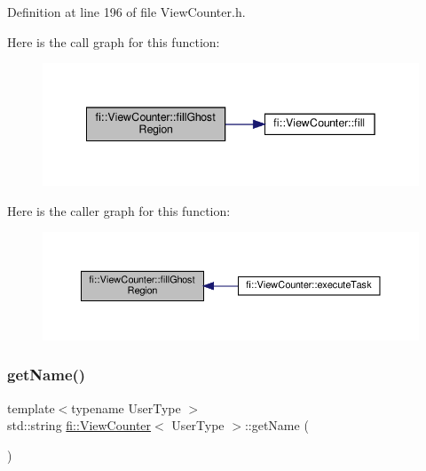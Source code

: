 Definition at line 196 of file View\+Counter.\+h.

Here is the call graph for this function\+:
\nopagebreak
\begin{figure}[H]
\begin{center}
\leavevmode
\includegraphics[width=342pt]{df/dae/classfi_1_1ViewCounter_a9b208c1ff386265adc30d4e338dbc2c8_cgraph}
\end{center}
\end{figure}
Here is the caller graph for this function\+:
\nopagebreak
\begin{figure}[H]
\begin{center}
\leavevmode
\includegraphics[width=350pt]{df/dae/classfi_1_1ViewCounter_a9b208c1ff386265adc30d4e338dbc2c8_icgraph}
\end{center}
\end{figure}
\mbox{\label{classfi_1_1ViewCounter_a555dfa42020fa6cc1a710221838b2e1e}} 
\subsubsection{\texorpdfstring{get\+Name()}{getName()}}
{\footnotesize\ttfamily template$<$typename User\+Type $>$ \\
std\+::string \hyperlink{classfi_1_1ViewCounter}{fi\+::\+View\+Counter}$<$ User\+Type $>$\+::get\+Name (\begin{DoxyParamCaption}{ }\end{DoxyParamCaption})\hspace{0.3cm}{\ttfamily [inline]}}



